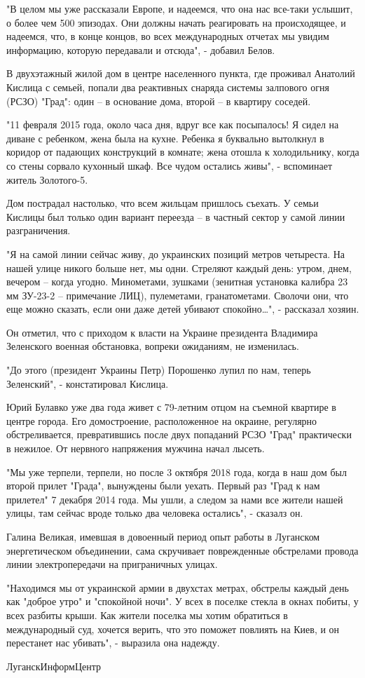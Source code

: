 "В целом мы уже рассказали Европе, и надеемся, что она нас все-таки услышит, о
более чем 500 эпизодах. Они должны начать реагировать на происходящее, и
надеемся, что, в конце концов, во всех международных отчетах мы увидим
информацию, которую передавали и отсюда", - добавил Белов. 

В двухэтажный жилой дом в центре населенного пункта, где проживал Анатолий
Кислица с семьей, попали два реактивных снаряда системы залпового огня (РСЗО)
"Град": один – в основание дома, второй – в квартиру соседей. 

"11 февраля 2015 года, около часа дня, вдруг все как посыпалось! Я сидел на
диване с ребенком, жена была на кухне. Ребенка я буквально вытолкнул в коридор
от падающих конструкций в комнате; жена отошла к холодильнику, когда со стены
сорвало кухонный шкаф. Все чудом остались живы", - вспоминает житель
Золотого-5. 

Дом пострадал настолько, что всем жильцам пришлось съехать. У семьи Кислицы был
только один вариант переезда – в частный сектор у самой линии разграничения. 

"Я на самой линии сейчас живу, до украинских позиций метров четыреста. На нашей
улице никого больше нет, мы одни. Стреляют каждый день: утром, днем, вечером –
когда угодно. Минометами, зушками (зенитная установка калибра 23 мм ЗУ-23-2 –
примечание ЛИЦ), пулеметами, гранатометами. Сволочи они, что еще можно сказать,
если они даже детей убивают спокойно…", - рассказал хозяин. 

Он отметил, что с приходом к власти на Украине президента Владимира Зеленского
военная обстановка, вопреки ожиданиям, не изменилась. 

"До этого (президент Украины Петр) Порошенко лупил по нам, теперь Зеленский", -
констатировал Кислица. 

Юрий Булавко уже два года живет с 79-летним отцом на съемной квартире в центре
города. Его домостроение, расположенное на окраине, регулярно обстреливается,
превратившись после двух попаданий РСЗО "Град" практически в нежилое. От
нервного напряжения мужчина начал лысеть. 

"Мы уже терпели, терпели, но после 3 октября 2018 года, когда в наш дом был
второй прилет "Града", вынуждены были уехать. Первый раз "Град к нам прилетел"
7 декабря 2014 года. Мы ушли, а следом за нами все жители нашей улицы, там
сейчас вроде только два человека остались", - сказалз он. 

Галина Великая, имевшая в довоенный период опыт работы в Луганском
энергетическом объединении, сама скручивает поврежденные обстрелами провода
линии электропередачи на приграничных улицах. 

"Находимся мы от украинской армии в двухстах метрах, обстрелы каждый день как
"доброе утро" и "спокойной ночи". У всех в поселке стекла в окнах побиты, у
всех разбиты крыши. Как жители поселка мы хотим обратиться в международный суд,
хочется верить, что это поможет повлиять на Киев, и он перестанет нас убивать",
- выразила она надежду. 



ЛуганскИнформЦентр
  
